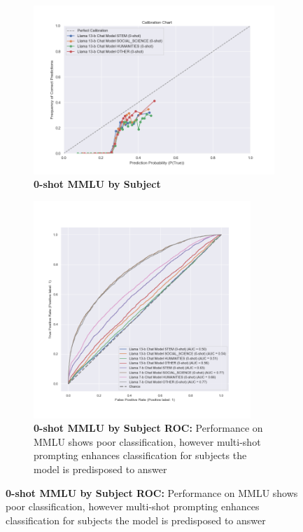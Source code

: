 \documentclass[11pt]{article}
\begin{document}
\begin{figure}
     \centering
     \begin{subfigure}[b]{0.60\textwidth}
         \centering \includegraphics[width=1.1\textwidth]{figures/0-MMLU-subjects.png}
         \caption{\textbf{0-shot MMLU by Subject} }
         \label{fig:0-shot-MMLU}
     \end{subfigure}
     \hfill
     \begin{subfigure}[b]{0.38\textwidth}
         \centering \includegraphics[width=0.9\textwidth]{figures/0-shot-MMLU-subjects-roc.png}
         \caption{\textbf{0-shot MMLU by Subject ROC:} Performance on MMLU shows poor classification, however multi-shot prompting enhances classification for subjects the model is predisposed to answer}
         \label{fig:0-shot-MMLU-ROC}
    \end{subfigure}
    

\end{figure}
\end{document}
